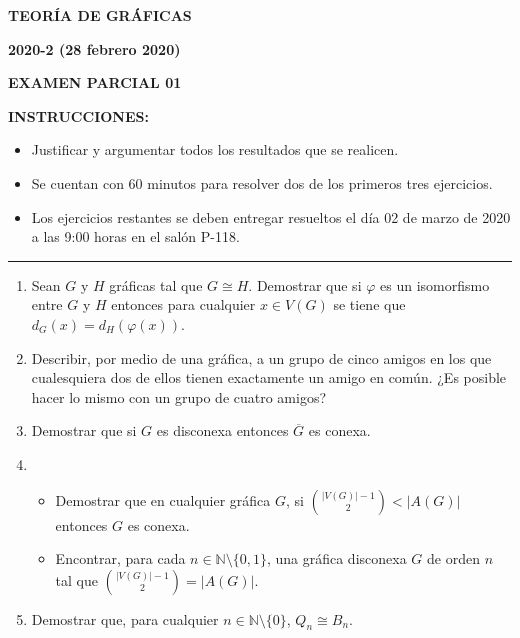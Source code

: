 \documentclass[10pt]{report}
\begin{document}
\vspace{2cm}


\begin{center}
\textbf{\LARGE {TEORÍA DE GRÁFICAS}}
\end{center}

\begin{center}
\textbf{{\large 2020-2 (28 febrero 2020)}}
\end{center}

\begin{center}
\textbf{{\large EXAMEN PARCIAL 01}}
\end{center}

{\bf INSTRUCCIONES:} 
\begin{itemize}
\item Justificar y argumentar todos los resultados que se realicen.
\item Se cuentan con 60 minutos para resolver dos de los primeros tres ejercicios.
\item Los ejercicios restantes se deben entregar resueltos el día 02 de marzo de 2020 a las 9:00 horas en el salón P-118.
\end{itemize}

\begin{center}
\rule[0mm]{20cm}{0.2mm}
\end{center}

\begin{enumerate}

\item Sean $G$ y $H$ gráficas tal que $G \cong H$. Demostrar que si $\varphi$ es un isomorfismo entre $G$ y $H$ entonces para cualquier $x \in V(G)$ se tiene que $d_G(x) = d_H(\varphi(x))$.

\item Describir, por medio de una gráfica, a un grupo de cinco amigos en los que cualesquiera dos de ellos tienen exactamente un amigo en común. ¿Es posible hacer lo mismo con un grupo de cuatro amigos?

\item Demostrar que si $G$ es disconexa entonces $\overline{G}$ es conexa. 

\item
\begin{itemize}
\item Demostrar que en cualquier gráfica $G$, si ${|V(G)| -1 \choose 2} < |A(G)|$ entonces $G$ es conexa.
\item Encontrar, para cada $n \in \mathbb{N} \setminus \{0,1\}$, una gráfica disconexa $G$ de orden $n$ tal que ${|V(G)| -1 \choose 2} = |A(G)|$.
\end{itemize}

\item Demostrar que, para cualquier $n \in \mathbb{N} \setminus \{0\}$, $Q_n \cong B_n$.

\end{enumerate}
\end{document}
